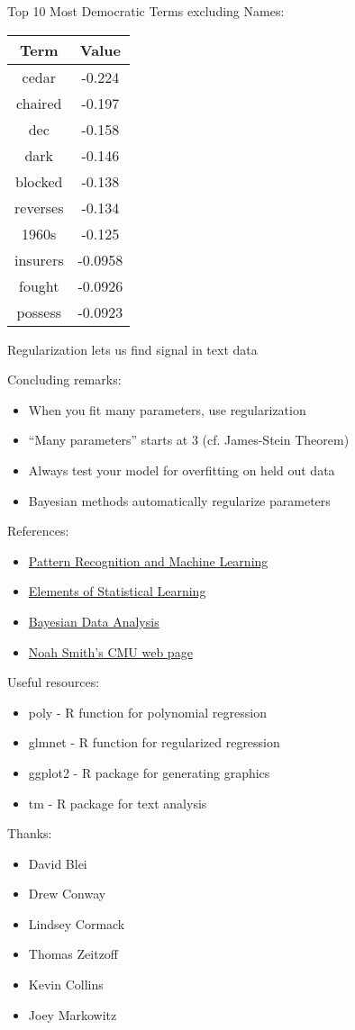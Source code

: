 \documentclass[xcolor=pdftex,dvipsnames,table]{beamer}
\begin{document}
\frame
{
	Top 10 Most Democratic Terms excluding Names:
	\begin{table}[htdp]
	\begin{center}
	\begin{tabular}{|c|c|}
	\hline
	Term & Value \\ 
	\hline
	cedar & -0.224 \\
	chaired & -0.197 \\
	dec & -0.158 \\
	dark & -0.146 \\
	blocked & -0.138 \\
	reverses & -0.134 \\
	1960s & -0.125 \\
	insurers & -0.0958 \\
	fought & -0.0926 \\
	possess & -0.0923 \\
	\hline
	\end{tabular}
	\end{center}
	\label{default}
	\end{table}
}

\frame
{
	Regularization lets us find signal in text data
}

\frame
{
	Concluding remarks:
	\begin{itemize}
		\item{When you fit many parameters, use regularization}
		\item{``Many parameters'' starts at 3 (cf. James-Stein Theorem)}
		\item{Always test your model for overfitting on held out data}
		\item{Bayesian methods automatically regularize parameters}
	\end{itemize}
}

\frame
{
	References:
	\begin{itemize}
		\item{\href{http://research.microsoft.com/en-us/um/people/cmbishop/prml/}{Pattern Recognition and Machine Learning}}
		\item{\href{http://www-stat.stanford.edu/~tibs/ElemStatLearn/}{Elements of Statistical Learning}}
		\item{\href{http://www.stat.columbia.edu/~gelman/book/}{Bayesian Data Analysis}}
		\item{\href{http://www.cs.cmu.edu/~nasmith/}{Noah Smith's CMU web page}}
	\end{itemize}
}

\frame
{
	Useful resources:
	\begin{itemize}
		\item{poly - R function for polynomial regression}
		\item{glmnet - R function for regularized regression}
		\item{ggplot2 - R package for generating graphics}
		\item{tm - R package for text analysis}
	\end{itemize}
}

\frame
{
	Thanks:
	\begin{itemize}
		\item{David Blei}
		\item{Drew Conway}
		\item{Lindsey Cormack}
		\item{Thomas Zeitzoff}
		\item{Kevin Collins}
		\item{Joey Markowitz}
	\end{itemize}
}
\end{document}
